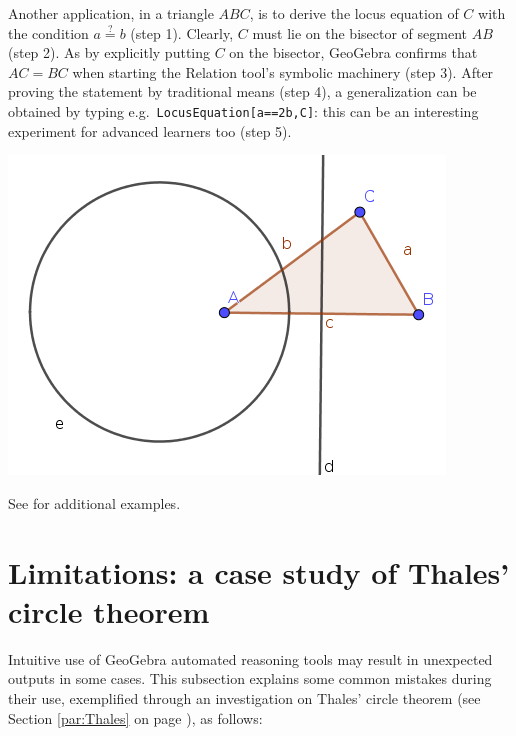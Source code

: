 \documentclass{article}
\begin{document}
Another application, in a triangle $ABC$, is to derive the locus equation
of $C$ with the condition $a\stackrel{?}{=}b$ (step 1). Clearly, $C$ must
lie on the bisector of segment $AB$ (step 2). As  by explicitly putting
$C$ on the bisector, GeoGebra confirms that $AC=BC$ when starting the
Relation tool's symbolic machinery (step 3). After proving the statement
by traditional means (step 4), a generalization can be obtained by typing
e.g.~\texttt{LocusEquation[a==2b,C]}: this can be an interesting
experiment for advanced learners too (step 5).
\begin{center}
\includegraphics[scale=0.5]{further2}
\end{center}

See \cite{Kovacs2017} for additional examples.

\section{Limitations: a case study of Thales' circle theorem}

Intuitive use of GeoGebra automated reasoning tools may result in unexpected outputs in some cases. This subsection explains some common mistakes during their use, exemplified through an investigation on Thales' circle theorem  (see Section \ref{par:Thales} on page \pageref{par:Thales}), as follows:
\end{document}
